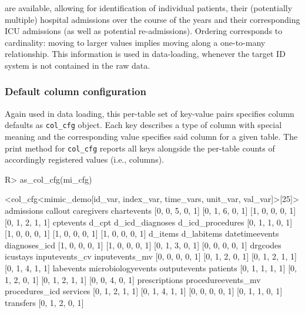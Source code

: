\documentclass[
  notitle,
  nojss,
  noheadings]{jss}
\begin{document}
are available, allowing for identification of individual patients, their
(potentially multiple) hospital admissions over the course of the years
and their corresponding ICU admissions (as well as potential
re-admissions). Ordering corresponds to cardinality: moving to larger
values implies moving along a one-to-many relationship. This information
is used in data-loading, whenever the target ID system is not contained
in the raw data.

\hypertarget{default-column-configuration}{%
\subsubsection{Default column
configuration}\label{default-column-configuration}}

Again used in data loading, this per-table set of key-value pairs
specifies column defaults as \texttt{col\_cfg} object. Each key
describes a type of column with special meaning and the corresponding
value specifies said column for a given table. The print method for
\texttt{col\_cfg} reports all keys alongside the per-table counts of
accordingly registered values (i.e., columns).

\begin{CodeChunk}
\begin{CodeInput}
R> as_col_cfg(mi_cfg)
\end{CodeInput}
\begin{CodeOutput}
<col_cfg<mimic_demo[id_var, index_var, time_vars, unit_var, val_var]>[25]>
        admissions            callout         caregivers        chartevents 
   [0, 0, 5, 0, 1]    [0, 1, 6, 0, 1]    [1, 0, 0, 0, 1]    [0, 1, 2, 1, 1] 
         cptevents              d_cpt    d_icd_diagnoses   d_icd_procedures 
   [0, 1, 1, 0, 1]    [1, 0, 0, 0, 1]    [1, 0, 0, 0, 1]    [1, 0, 0, 0, 1] 
           d_items         d_labitems     datetimeevents      diagnoses_icd 
   [1, 0, 0, 0, 1]    [1, 0, 0, 0, 1]    [0, 1, 3, 0, 1]    [0, 0, 0, 0, 1] 
          drgcodes           icustays     inputevents_cv     inputevents_mv 
   [0, 0, 0, 0, 1]    [0, 1, 2, 0, 1]    [0, 1, 2, 1, 1]    [0, 1, 4, 1, 1] 
         labevents microbiologyevents       outputevents           patients 
   [0, 1, 1, 1, 1]    [0, 1, 2, 0, 1]    [0, 1, 2, 1, 1]    [0, 0, 4, 0, 1] 
     prescriptions procedureevents_mv     procedures_icd           services 
   [0, 1, 2, 1, 1]    [0, 1, 4, 1, 1]    [0, 0, 0, 0, 1]    [0, 1, 1, 0, 1] 
         transfers 
   [0, 1, 2, 0, 1] 
\end{CodeOutput}
\end{CodeChunk}
\end{document}
